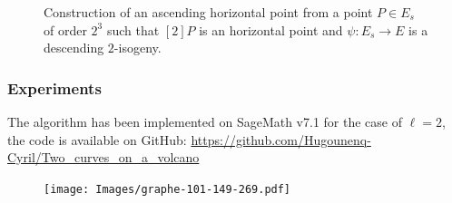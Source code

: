 \documentclass[10pt,a4paper]{beamer}
\theoremstyle{plain}
\theoremstyle{definition}
\theoremstyle{definition}
\theoremstyle{definition}
\theoremstyle{definition}
\theoremstyle{remark}
\theoremstyle{remark}
\begin{document}
\begin{frame}
\begin{figure}
\begin{center}
\begin{tikzpicture}[scale=0.50]
\end{tikzpicture}
\end{center}
\caption{ Construction of an ascending horizontal point from a point $P \in 
E_s$ of order $2^3$ such that $[2]P$ is an horizontal point and $\psi: E_s 
\rightarrow E$ is a descending $2$-isogeny.} 
\end{figure}
\end{frame}


\begin{frame}
\frametitle{Experiments}
The algorithm has been implemented on SageMath v7.1 for the case of $\ell=2$, the code is available on GitHub: \url{https://github.com/Hugounenq-Cyril/Two_curves_on_a_volcano}
\begin{figure}[hbtp]
\centering
\texttt{[image: Images/graphe-101-149-269.pdf]}
\end{figure}
\end{frame}


\end{document}
